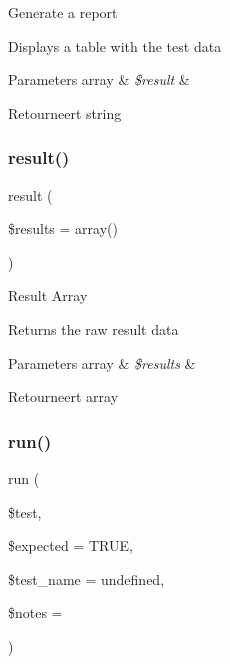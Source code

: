 Generate a report

Displays a table with the test data


\begin{DoxyParams}[1]{Parameters}
array & {\em \$result} & \\
\hline
\end{DoxyParams}
\begin{DoxyReturn}{Retourneert}
string 
\end{DoxyReturn}
\mbox{\label{class_c_i___unit__test_adcfdd404b2f2610e0690b4beb7786ce5}} 
\subsubsection{\texorpdfstring{result()}{result()}}
{\footnotesize\ttfamily result (\begin{DoxyParamCaption}\item[{}]{\$results = {\ttfamily array()} }\end{DoxyParamCaption})}

Result Array

Returns the raw result data


\begin{DoxyParams}[1]{Parameters}
array & {\em \$results} & \\
\hline
\end{DoxyParams}
\begin{DoxyReturn}{Retourneert}
array 
\end{DoxyReturn}
\mbox{\label{class_c_i___unit__test_a0bb74f4cb9553ace4034633e69383c55}} 
\subsubsection{\texorpdfstring{run()}{run()}}
{\footnotesize\ttfamily run (\begin{DoxyParamCaption}\item[{}]{\$test,  }\item[{}]{\$expected = {\ttfamily TRUE},  }\item[{}]{\$test\+\_\+name = {\ttfamily \textquotesingle{}undefined\textquotesingle{}},  }\item[{}]{\$notes = {\ttfamily \textquotesingle{}\textquotesingle{}} }\end{DoxyParamCaption})}

